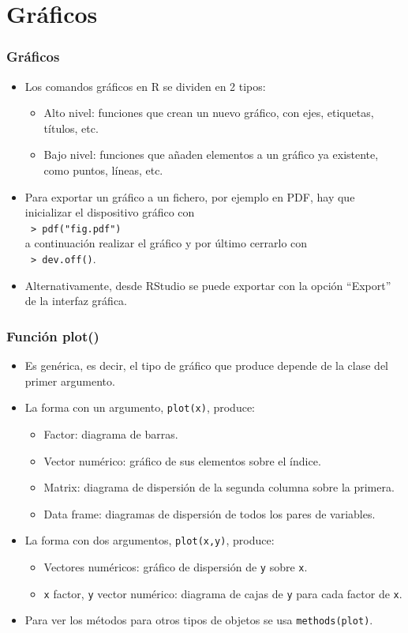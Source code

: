 \documentclass{beamer}
\begin{document}
\section{Gráficos}

\begin{frame}
\frametitle{Gráficos}
\begin{itemize}
\item Los comandos gráficos en R se dividen en 2 tipos:
\begin{itemize}
\item Alto nivel: funciones que crean un nuevo gráfico, con ejes, etiquetas, títulos, etc.
\item Bajo nivel: funciones que añaden elementos a un gráfico ya existente, como puntos, líneas, etc.
\end{itemize}
\item Para exportar un gráfico a un fichero, por ejemplo en PDF, hay que inicializar el dispositivo gráfico con \\
\texttt{   > pdf("fig.pdf")}\\
a continuación realizar el gráfico y por último cerrarlo con\\ \texttt{   > dev.off()}.
\item Alternativamente, desde RStudio se puede exportar con la opción ``Export'' de la interfaz gráfica.
\end{itemize}
\end{frame}

\begin{frame}
\frametitle{Función plot()}
\begin{itemize}
\item Es genérica, es decir, el tipo de gráfico que produce depende de la clase del primer argumento.
\item La forma con un argumento, \texttt{plot(x)}, produce:
\begin{itemize}
\item Factor: diagrama de barras.
\item Vector numérico: gráfico de sus elementos sobre el índice.
\item Matrix: diagrama de dispersión de la segunda columna sobre la primera.
\item Data frame: diagramas de dispersión de todos los pares de variables.
\end{itemize}
\item La forma con dos argumentos, \texttt{plot(x,y)}, produce:
\begin{itemize}
\item Vectores numéricos: gráfico de dispersión de \texttt{y} sobre \texttt{x}.
\item \texttt{x} factor, \texttt{y} vector numérico: diagrama de cajas de \texttt{y} para cada factor de \texttt{x}.
\end{itemize}
\item Para ver los métodos para otros tipos de objetos se usa \texttt{methods(plot)}.
\end{itemize}
\end{frame}
\end{document}
